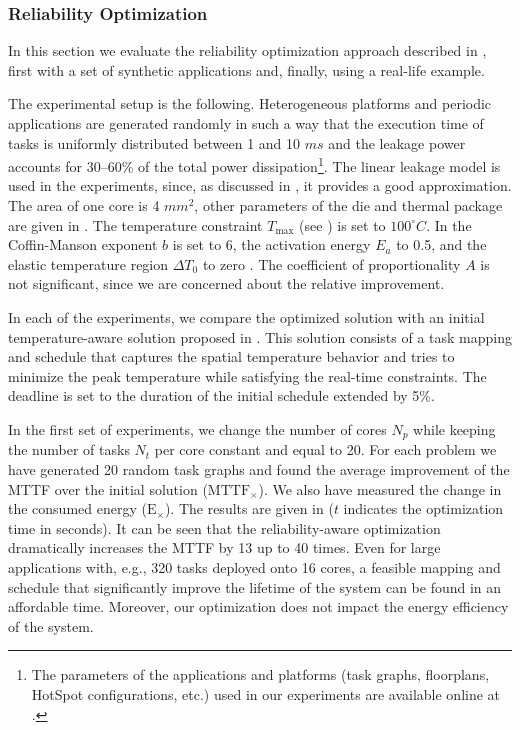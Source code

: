 \subsubsection{Reliability Optimization}

In this section we evaluate the reliability optimization approach described in
, first with a set of synthetic applications and,
finally, using a real-life example.

The experimental setup is the following. Heterogeneous platforms and periodic
applications are generated randomly \cite{dick1998} in such a way that the
execution time of tasks is uniformly distributed between 1 and 10 $ms$ and the
leakage power accounts for 30--60\% of the total power dissipation\footnote{The
parameters of the applications and platforms (task graphs, floorplans, HotSpot
configurations, etc.) used in our experiments are available online at
\cite{liu2011}.}. The linear leakage model is used in the experiments, since, as
discussed in , it provides a good approximation. The
area of one core is 4 $mm^2$, other parameters of the die and thermal package
are given in . The temperature constraint $T_\text{max}$ (see
) is set to $100^\circ C$. In  the
Coffin-Manson exponent $b$ is set to 6, the activation energy $E_a$ to 0.5, and
the elastic temperature region $\Delta T_0$ to zero \cite{jedec2010}. The
coefficient of proportionality $A$ is not significant, since we are concerned
about the relative improvement.

In each of the experiments, we compare the optimized solution with an initial
temperature-aware solution proposed in \cite{xie2006}. This solution consists of
a task mapping and schedule that captures the spatial temperature behavior and
tries to minimize the peak temperature while satisfying the real-time
constraints. The deadline is set to the duration of the initial schedule
extended by 5\%.

In the first set of experiments, we change the number of cores $N_p$ while
keeping the number of tasks $N_t$ per core constant and equal to 20. For each
problem we have generated 20 random task graphs and found the average
improvement of the MTTF over the initial solution ($\scriptstyle
\text{MTTF}_\times$). We also have measured the change in the consumed energy
($\scriptstyle \text{E}_\times$). The results are given in 
($t$ indicates the optimization time in seconds). It can be seen that the
reliability-aware optimization dramatically increases the MTTF by 13 up to 40
times. Even for large applications with, e.g., 320 tasks deployed onto 16 cores,
a feasible mapping and schedule that significantly improve the lifetime of the
system can be found in an affordable time. Moreover, our optimization does not
impact the energy efficiency of the system.

